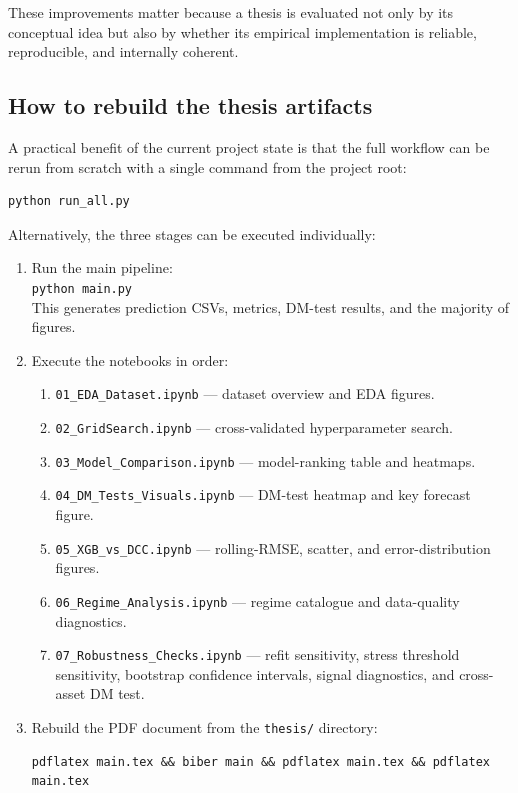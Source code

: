 These improvements matter because a thesis is evaluated not only by its conceptual idea but also by whether its empirical implementation is reliable, reproducible, and internally coherent.

\subsection{How to rebuild the thesis artifacts}

A practical benefit of the current project state is that the full workflow can be rerun from scratch with a single command from the project root:

\begin{lstlisting}[language={}, caption={Full rebuild from the project root directory.}, label=lst:rebuild]
python run_all.py
\end{lstlisting}

Alternatively, the three stages can be executed individually:

\begin{enumerate}
    \item Run the main pipeline:\\
          \texttt{python main.py}\\
          This generates prediction CSVs, metrics, DM-test results, and the majority of figures.
    \item Execute the notebooks in order:
    \begin{enumerate}
        \item \texttt{01\_EDA\_Dataset.ipynb} --- dataset overview and EDA figures.
        \item \texttt{02\_GridSearch.ipynb} --- cross-validated hyperparameter search.
        \item \texttt{03\_Model\_Comparison.ipynb} --- model-ranking table and heatmaps.
        \item \texttt{04\_DM\_Tests\_Visuals.ipynb} --- DM-test heatmap and key forecast figure.
        \item \texttt{05\_XGB\_vs\_DCC.ipynb} --- rolling-RMSE, scatter, and error-distribution figures.
        \item \texttt{06\_Regime\_Analysis.ipynb} --- regime catalogue and data-quality diagnostics.
        \item \texttt{07\_Robustness\_Checks.ipynb} --- refit sensitivity, stress threshold sensitivity, bootstrap confidence intervals, signal diagnostics, and cross-asset DM test.
    \end{enumerate}
    \item Rebuild the PDF document from the \texttt{thesis/} directory:
\begin{lstlisting}[language={}]
pdflatex main.tex && biber main && pdflatex main.tex && pdflatex main.tex
\end{lstlisting}
\end{enumerate}

